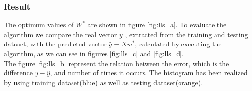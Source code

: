 \documentclass[a4paper,12pt,oneside,titlepage]{article}
\begin{document}
	\subsubsection{Result}
	The optimum values of $W^*$ are shown in figure \ref{fig:lls_a}. To evaluate the algorithm we compare the real vector $y$ , extracted from the training and testing dataset, with the predicted vector $\hat {y} = Xw^*$, calculated by executing the
	algorithm, as we can see in figures \ref{fig:lls_c} and \ref{fig:lls_d}.\\
	The figure \ref{fig:lls_b} represent the relation between the error, which is the difference $y-\hat {y}$,
	and number of times it occurs. The histogram has been realized by using training dataset(blue) as well as testing dataset(orange).
	\begin{figure}[H]
		\centering
		\begin{center}			
			\\

\end{center}
\end{figure}
\end{document}
